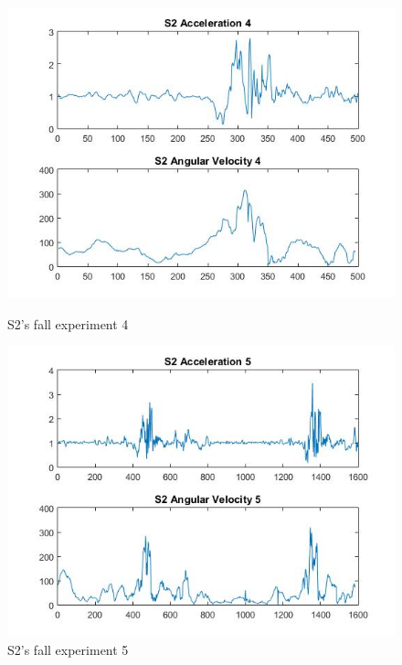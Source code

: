 \documentclass[letterpaper,12pt,titlepage,oneside,final]{book}
\begin{document}
\begin{figure}[h!]
	\centering
	\hspace{-1cm}
	\begin{minipage}[b]{0.5\textwidth}
		\centering
		\includegraphics[scale=0.42]{S2_4}
		\caption{S2's fall experiment 4}
	\end{minipage}%
	\hfill
	\begin{minipage}[b]{0.5\textwidth}
		\centering
		\includegraphics[scale=0.42]{S2_5}
		\caption{S2's fall experiment 5}
	\end{minipage}	
\end{figure}
\end{document}
